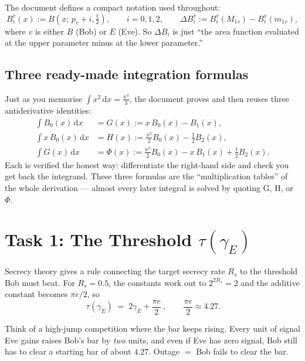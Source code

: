 \documentclass[11pt]{article}
\begin{document}
The document defines a compact notation used throughout:
\[
B_i^{v}(x) := B\!\left(x;\,p_v+i,\tfrac12\right),\qquad i=0,1,2,
\qquad
\Delta B_i^{v} := B_i^{v}(M_{1v}) - B_i^{v}(m_{1v}),
\]
where $v$ is either $B$ (Bob) or $E$ (Eve). So $\Delta B_i$ is just ``the area
function evaluated at the upper parameter minus at the lower parameter.''

\subsection{Three ready-made integration formulas}

Just as you memorise $\int x^2\,\mathrm{d}x = \frac{x^3}{3}$, the document proves and
then reuses three antiderivative identities:
\begin{align}
\int B_0(x)\,\mathrm{d}x &= G(x) := x\,B_0(x) - B_1(x), \tag{G}\\
\int x\,B_0(x)\,\mathrm{d}x &= H(x) := \tfrac{x^2}{2}B_0(x) - \tfrac12 B_2(x), \tag{H}\\
\int G(x)\,\mathrm{d}x &= \Phi(x) := \tfrac{x^2}{2}B_0(x) - x\,B_1(x) + \tfrac12 B_2(x). \tag{$\Phi$}
\end{align}
Each is verified the honest way: differentiate the right-hand side and check you get
back the integrand. These three formulas are the ``multiplication tables'' of the whole
derivation --- almost every later integral is solved by quoting G, H, or $\Phi$.

\section{Task 1: The Threshold $\tau(\gamma_E)$}

Secrecy theory gives a rule connecting the target secrecy rate $R_s$ to the threshold
Bob must beat. For $R_s = 0.5$, the constants work out to $2^{2R_s}=2$ and the additive
constant becomes $\pi e/2$, so
\[
\boxed{\ \tau(\gamma_E) \;=\; 2\gamma_E + \frac{\pi e}{2}\ },
\qquad \frac{\pi e}{2}\approx 4.27 .
\]

\begin{analogybox}
Think of a high-jump competition where the bar keeps rising. Every unit of signal Eve
gains raises Bob's bar by \emph{two} units, and even if Eve has zero signal, Bob still
has to clear a starting bar of about $4.27$. Outage $=$ Bob fails to clear the bar.
\end{analogybox}
\end{document}
